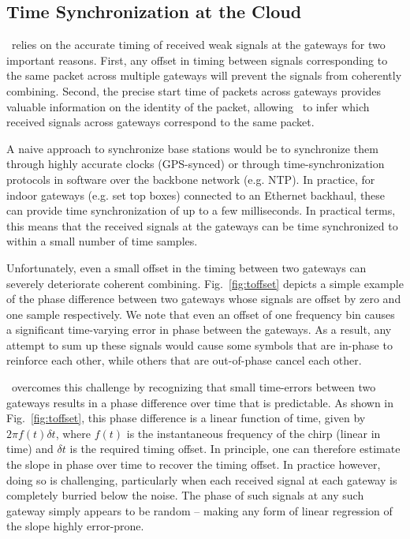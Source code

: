 \subsection{Time Synchronization at the Cloud}
\name\ relies on the accurate timing of received weak signals at the gateways for two important reasons. First, any offset in timing between signals corresponding to the same packet across multiple gateways will prevent the signals from coherently combining. Second, the precise start time of packets across gateways provides valuable information on the identity of the packet, allowing \name\ to infer which received signals across gateways correspond to the same packet.

A naive approach to synchronize base stations would be to synchronize them through highly accurate clocks (GPS-synced) or through time-synchronization protocols in software over the backbone network (e.g. NTP). In practice, for indoor gateways (e.g. set top boxes) connected to an Ethernet backhaul, these can provide time synchronization of up to a few milliseconds. In practical terms, this means that the received signals at the gateways can be time synchronized to within a small number of time samples. 

Unfortunately, even a small offset in the timing between two gateways can severely deteriorate coherent combining. Fig.~\ref{fig:toffset} depicts a simple example of the phase difference between two gateways whose signals are offset by zero and one sample respectively. We note that even an offset of one frequency bin causes a significant time-varying error in phase between the gateways. As a result, any attempt to sum up these signals would cause some symbols that are in-phase to reinforce each other, while others that are out-of-phase cancel each other. \vspace*{0.1in}

 \name\ overcomes this challenge by recognizing that small time-errors between two gateways results in a phase difference over time that is predictable. As shown in Fig.~\ref{fig:toffset}, this phase difference is a linear function of time, given by $2\pi f(t) \delta t$, where $f(t)$ is the instantaneous frequency of the chirp (linear in time) and $\delta t$ is the required timing offset. In principle, one can therefore estimate the slope in phase over time to recover the timing offset. In practice however, doing so is challenging, particularly when each received signal at each gateway is completely burried below the noise. The phase of such signals at any such gateway simply appears to be random -- making any form of linear regression of the slope highly error-prone.

